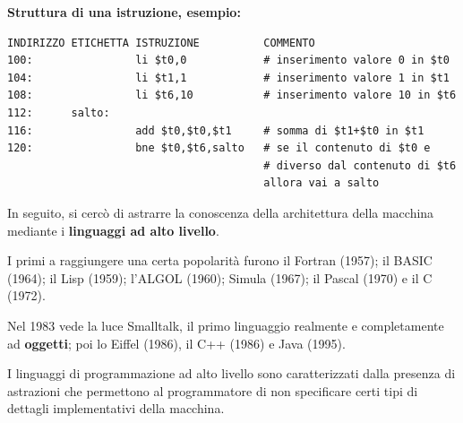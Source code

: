 \documentclass[12pt]{article} %
\begin{document}
\textbf{Struttura di una istruzione, esempio:}
\begin{lstlisting}
INDIRIZZO ETICHETTA ISTRUZIONE          COMMENTO
100:                li $t0,0            # inserimento valore 0 in $t0
104:                li $t1,1            # inserimento valore 1 in $t1
108:                li $t6,10           # inserimento valore 10 in $t6
112:      salto:
116:                add $t0,$t0,$t1     # somma di $t1+$t0 in $t1
120:                bne $t0,$t6,salto   # se il contenuto di $t0 e
                                        # diverso dal contenuto di $t6 
                                        allora vai a salto
\end{lstlisting}
\vspace{\baselineskip}
In seguito, si cercò di astrarre la conoscenza della architettura della macchina mediante i \textbf{linguaggi ad alto livello}.\par\medskip\noindent 
I primi a raggiungere una certa popolarità furono il Fortran (1957); il BASIC (1964); il Lisp (1959); l'ALGOL (1960); Simula (1967); il Pascal (1970) e il C (1972). \par\medskip\noindent 
Nel 1983 vede la luce Smalltalk, il primo linguaggio realmente e completamente ad \textbf{oggetti}; poi lo Eiffel (1986), il C++ (1986) e Java (1995).\par\medskip\noindent
I linguaggi di programmazione ad alto livello sono caratterizzati dalla presenza di astrazioni che permettono al programmatore di non specificare certi tipi di dettagli implementativi della macchina.\par\medskip\noindent
\end{document}
